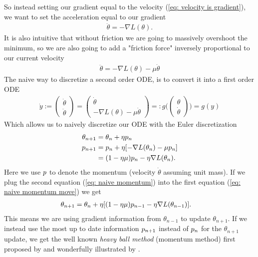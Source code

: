 So instead setting our gradient equal to the velocity (\ref{eq: velocity is
gradient}), we want to set the acceleration equal to our gradient
%
\begin{align*}
	\ddot{\theta} = -\nabla L(\theta).
\end{align*}
%
It is also intuitive that without friction we are going to massively overshoot
the minimum, so we are also going to add a "friction force" inversely proportional
to our current velocity
%
\begin{align}\label{eq: acceleration is gradient + friction}
	\ddot{\theta} = -\nabla L(\theta) - \mu \dot{\theta}
\end{align}
%
The naive way to discretize a second order ODE, is to convert it into a first
order ODE
%
\begin{align*}
	\dot{y} := \begin{pmatrix}
		\dot{\theta}\\
		\ddot{\theta}
	\end{pmatrix}
	= \begin{pmatrix}
		\dot{\theta} \\
		-\nabla L(\theta) - \mu \dot{\theta}
	\end{pmatrix}
	=: g\Big(\begin{pmatrix}
		\theta \\
		\dot{\theta}
	\end{pmatrix}\Big)
	= g(y)
\end{align*}
%
Which allows us to naively discretize our ODE with the Euler discretization
%
\begin{subequations}
\begin{align}
	\theta_{n+1} &= \theta_n + \eta p_n \label{eq: naive momentum move}\\
	p_{n+1} &= p_n + \eta [-\nabla L(\theta_n) - \mu p_n]
	\label{eq: naive momentum}\\ \nonumber
	&= (1-\eta\mu)p_n - \eta\nabla L(\theta_n).
\end{align}
\end{subequations}
%
Here we use \(p\) to denote the momentum (velocity \(\dot{\theta}\)
assuming unit mass).
If we plug the second equation (\ref{eq: naive momentum}) into the first
equation (\ref{eq: naive momentum move}) we get
%
\begin{align*}
	\theta_{n+1}
	&= \theta_n + \eta [(1-\eta\mu)p_{n-1} - \eta\nabla L(\theta_{n-1})].
\end{align*}
%
This means we are using gradient information from \(\theta_{n-1}\) to update
\(\theta_{n+1}\). If we instead use the most up to date information
\(p_{n+1}\) instead of \(p_n\) for the \(\theta_{n+1}\) update,
we get the well known \emph{heavy ball method} (momentum method) first proposed
by \textcite{polyakMethodsSpeedingConvergence1964} and wonderfully illustrated
by \textcite{gohWhyMomentumReally2017}.

